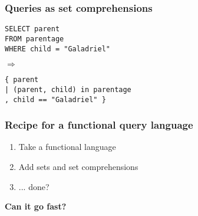 \documentclass[xcolor=table]{beamer}
\newcommand{\datafuncolor}{\color{blue}}
\begin{document}

\begin{frame}
  \frametitle{Queries as set comprehensions}
  \centering\Large

  \begin{minipage}{0.8\textwidth}
    \texttt{SELECT parent\\FROM parentage\\WHERE child = "Galadriel"}
  \end{minipage}

  \vspace{1.5em}
  {\LARGE $\Longrightarrow$}
  \vspace{1em}

  \begin{minipage}{0.8\textwidth}
    \datafuncolor
    \tt \{ parent \\
    | (parent, child) in parentage\\
    , child == "Galadriel" \}
  \end{minipage}

\end{frame}


\begin{frame}
  \frametitle{Recipe for a functional query language}
  \Large
  \begin{enumerate}\itemsep 1.5em
  \item Take a functional language
  \item Add sets and set comprehensions
  \item {\color{red} ... done?}
  \end{enumerate}
\end{frame}


\begin{frame}
  \centering
  {\bf\huge Can it go fast?}
\end{frame}
\end{document}
